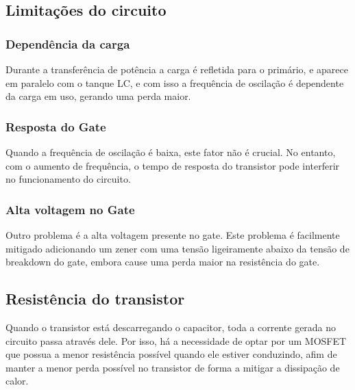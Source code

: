 \subsection{Limitações do circuito}

\subsubsection{Dependência da carga}
Durante a transferência de potência a carga é refletida para o primário, e aparece em paralelo com o tanque LC, e com isso a frequência de oscilação é dependente da carga em uso, gerando uma perda maior.
\subsubsection{Resposta do Gate}
Quando a frequência de oscilação é baixa, este fator não é crucial. No entanto, com o aumento de frequência, o tempo de resposta do transistor pode interferir no funcionamento do circuito.

\subsubsection{Alta voltagem no Gate}
Outro problema é a alta voltagem presente no gate. Este problema é facilmente mitigado adicionando um zener com uma tensão ligeiramente abaixo da tensão de breakdown do gate, embora cause uma perda maior na resistência do gate.

\subsection{Resistência do transistor}
Quando o transistor está descarregando o capacitor, toda a corrente gerada no circuito passa através dele. Por isso, há a necessidade de optar por um MOSFET que possua a menor resistência possível quando ele estiver conduzindo, afim de manter a menor perda possível no transistor de forma a mitigar a dissipação de calor.
